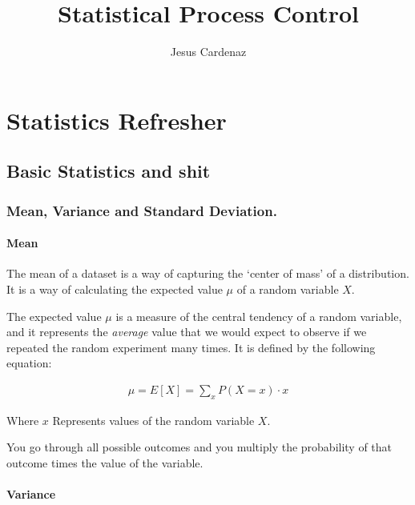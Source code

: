 \documentclass[11pt]{article}
\title{Statistical Process Control}
\author{Jesus Cardenaz}
\begin{document}
    
    \maketitle
    
    

    
    \hypertarget{statistics-refresher}{%
\section{Statistics Refresher}\label{statistics-refresher}}

    \hypertarget{basic-statistics-an-shit}{%
\subsection{Basic Statistics and shit}\label{basic-statistics-an-shit}}

    \hypertarget{mean-variance-and-standard-deviation.}{%
\subsubsection{Mean, Variance and Standard
Deviation.}\label{mean-variance-and-standard-deviation.}}

\hypertarget{mean}{%
\paragraph{Mean}\label{mean}}

The mean of a dataset is a way of capturing the `center of mass' of a
distribution. It is a way of calculating the expected value \(\mu\) of a
random variable \(X\).

The expected value \(\mu\) is a measure of the central tendency of a
random variable, and it represents the \emph{average} value that we
would expect to observe if we repeated the random experiment many times.
It is defined by the following equation:

\begin{gather}
  \mu = E[X] = \sum_{x} P(X = x) \cdot x
\end{gather}

Where \(x\) Represents values of the random variable \(X\).

You go through all possible outcomes and you multiply the probability of
that outcome times the value of the variable.



\hypertarget{variance}{%
\paragraph{Variance}\label{variance}}
\end{document}
